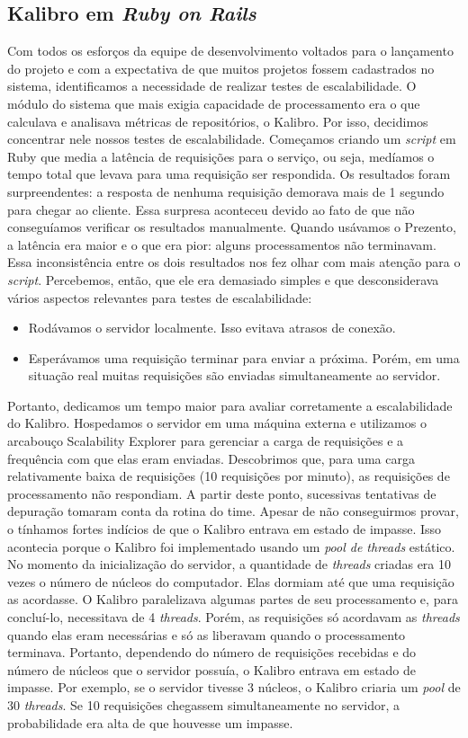 \documentclass{llncs}
\begin{document}
  \subsection{Kalibro em \textit{Ruby on Rails}}
  Com todos os esforços da equipe de desenvolvimento voltados para o lançamento do projeto e com a expectativa de que muitos projetos fossem cadastrados no sistema, identificamos a necessidade de realizar testes de escalabilidade. O módulo do sistema que mais exigia capacidade de processamento era o que calculava e analisava métricas de repositórios, o Kalibro. Por isso, decidimos concentrar nele nossos testes de escalabilidade.
  Começamos criando um \textit{script} em Ruby que media a latência de requisições para o serviço, ou seja, medíamos o tempo total que levava para uma requisição ser respondida. Os resultados foram surpreendentes: a resposta de nenhuma requisição demorava mais de 1 segundo para chegar ao cliente. Essa surpresa aconteceu devido ao fato de que não conseguíamos verificar os resultados manualmente. Quando usávamos o Prezento, a latência era maior e o que era pior: alguns processamentos não terminavam. Essa inconsistência entre os dois resultados nos fez olhar com mais atenção para o \textit{script}. Percebemos, então, que ele era demasiado simples e que desconsiderava vários aspectos relevantes para testes de escalabilidade:
  \begin{itemize}
    \item Rodávamos o servidor localmente. Isso evitava atrasos de conexão.
    \item Esperávamos uma requisição terminar para enviar a próxima. Porém, em uma situação real muitas requisições são enviadas simultaneamente ao servidor.
  \end{itemize}
  Portanto, dedicamos um tempo maior para avaliar corretamente a escalabilidade do Kalibro. Hospedamos o servidor em uma máquina externa e utilizamos o arcabouço Scalability Explorer \cite{moura2013automated} para gerenciar a carga de requisições e a frequência com que elas eram enviadas. Descobrimos que, para uma carga relativamente baixa de requisições (10 requisições por minuto), as requisições de processamento não respondiam. A partir deste ponto, sucessivas tentativas de depuração tomaram conta da rotina do time. Apesar de não conseguirmos provar, o tínhamos fortes indícios de que o Kalibro entrava em estado de impasse. Isso acontecia porque o Kalibro foi implementado usando um \textit{pool de threads} estático. No momento da inicialização do servidor, a quantidade de \textit{threads} criadas era 10 vezes o número de núcleos do computador. Elas dormiam até que uma requisição as acordasse. O Kalibro paralelizava algumas partes de seu processamento e, para concluí-lo, necessitava de 4 \textit{threads}. Porém, as requisições só acordavam as \textit{threads} quando elas eram necessárias e só as liberavam quando o processamento terminava. Portanto, dependendo do número de requisições recebidas e do número de núcleos que o servidor possuía, o Kalibro entrava em estado de impasse. Por exemplo, se o servidor tivesse 3 núcleos, o Kalibro criaria um \textit{pool} de 30 \textit{threads}. Se 10 requisições chegassem simultaneamente no servidor, a probabilidade era alta de que houvesse um impasse.
\end{document}
